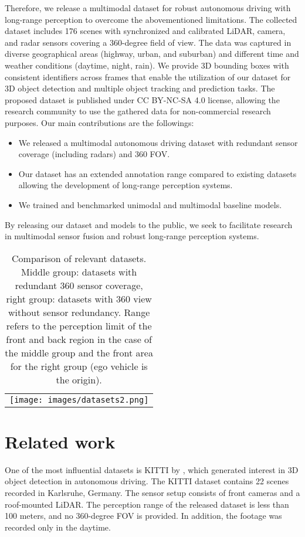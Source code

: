 \documentclass{article}
\begin{document}
Therefore, we release a multimodal dataset for robust autonomous driving with long-range perception to overcome the abovementioned limitations. The collected dataset includes 176 scenes with synchronized and calibrated LiDAR, camera, and radar sensors covering a 360-degree field of view. The data was captured in diverse geographical areas (highway, urban, and suburban) and different time and weather conditions (daytime, night, rain). We provide 3D bounding boxes with consistent identifiers across frames that enable the utilization of our dataset for 3D object detection and multiple object tracking and prediction tasks. The proposed dataset is published under CC BY-NC-SA 4.0 license, allowing the research community to use the gathered data for non-commercial research purposes. Our main contributions are the followings:
\begin{itemize}
  \item We released a multimodal autonomous driving dataset with redundant sensor coverage (including radars) and 360 FOV.
  \item Our dataset has an extended annotation range compared to existing datasets allowing the development of long-range perception systems.
  \item We trained and benchmarked unimodal and multimodal baseline models.
\end{itemize}

By releasing our dataset and models to the public, we seek to facilitate research in multimodal sensor fusion and robust long-range perception systems.

\begin{table}[t]
  \caption{Comparison of relevant datasets. Middle group: datasets with redundant 360 sensor coverage, right group: datasets with 360 view without sensor redundancy. Range refers to the perception limit of the front and back region in the case of the middle group and the front area for the right group (ego vehicle is the origin). }
  \centering  
  \begin{tabular}{c}       
    \texttt{[image: images/datasets2.png]}
  \end{tabular}  
  \label{tab:datasets}
\end{table}


\section{Related work}
\label{gen_inst}

One of the most influential datasets is KITTI by \citet{kitti}, which generated interest in 3D object detection in autonomous driving. The KITTI dataset contains 22 scenes recorded in Karlsruhe, Germany. The sensor setup consists of front cameras and a roof-mounted LiDAR. The perception range of the released dataset is less than 100 meters, and no 360-degree FOV is provided. In addition, the footage was recorded only in the daytime.
\end{document}
